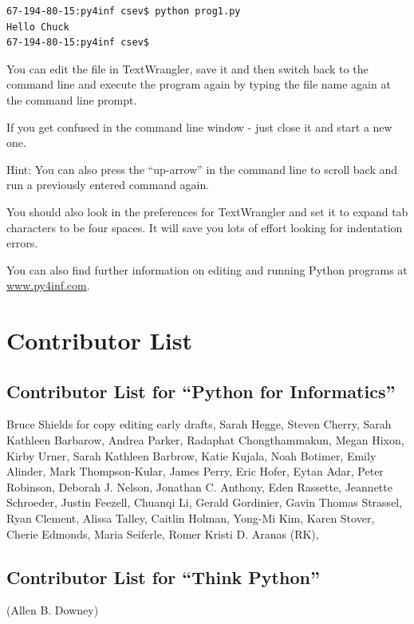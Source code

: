 \documentclass[11pt]{book}
\begin{document}
\beforeverb
\begin{verbatim}
67-194-80-15:py4inf csev$ python prog1.py
Hello Chuck
67-194-80-15:py4inf csev$ 
\end{verbatim}
\afterverb
%
You can edit the file in TextWrangler, save it and then switch back
to the command line and execute the program again by typing
the file name again at the command line prompt.

If you get confused in the command line window - just close it
and start a new one.

Hint: You can also press the ``up-arrow'' in the command line to 
scroll back and run a previously entered command again.

You should also look in the preferences for TextWrangler and set it 
to expand tab characters to be four spaces.  It will save you lots
of effort looking for indentation errors.

You can also find further information on editing and running 
Python programs at \url{www.py4inf.com}.



\chapter{Contributor List}
\section*{Contributor List for ``Python for Informatics''}

Bruce Shields for copy editing early drafts,
Sarah Hegge,
Steven Cherry,
Sarah Kathleen Barbarow,
Andrea Parker,
Radaphat Chongthammakun,
Megan Hixon,
Kirby Urner,
Sarah Kathleen Barbrow,
Katie Kujala,
Noah Botimer,
Emily Alinder,
Mark Thompson-Kular,
James Perry,
Eric Hofer,
Eytan Adar,
Peter Robinson,
Deborah J. Nelson,
Jonathan C. Anthony,
Eden Rassette,
Jeannette Schroeder,
Justin Feezell,
Chuanqi Li,
Gerald Gordinier,
Gavin Thomas Strassel,
Ryan Clement,
Alissa Talley,
Caitlin Holman,
Yong-Mi Kim,
Karen Stover,
Cherie Edmonds,
Maria Seiferle,
Romer Kristi D. Aranas (RK),


\section*{Contributor List for ``Think Python''}


(Allen B. Downey)
\end{document}
